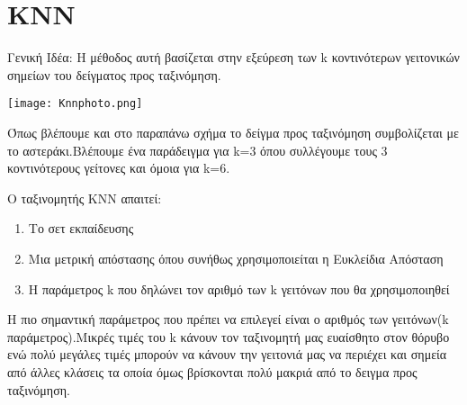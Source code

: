 \section{KNN}

Γενική Ιδέα: Η μέθοδος αυτή βασίζεται στην εξεύρεση των k κοντινότερων γειτονικών σημείων του δείγματος προς ταξινόμηση.

\begin{center}
	\texttt{[image: Knnphoto.png]}
	\label{fig:KNN}  
\end{center}

Όπως βλέπουμε και στο παραπάνω σχήμα το δείγμα προς ταξινόμηση συμβολίζεται με το αστεράκι.Βλέπουμε ένα παράδειγμα για k=3 όπου συλλέγουμε τους 3 κοντινότερους γείτονες και όμοια για k=6.

Ο ταξινομητής ΚΝΝ απαιτεί:
\begin{enumerate}
	\item Το σετ εκπαίδευσης
	\item Μια μετρική απόστασης όπου συνήθως χρησιμοποιείται η Ευκλείδια Απόσταση
	\item Η παράμετρος k που δηλώνει τον αριθμό των k γειτόνων που θα χρησιμοποιηθεί
\end{enumerate}

Η πιο σημαντική παράμετρος που πρέπει να επιλεγεί είναι ο αριθμός των γειτόνων(k παράμετρος).Μικρές τιμές του k κάνουν τον ταξινομητή μας ευαίσθητο στον θόρυβο ενώ πολύ μεγάλες τιμές μπορούν να κάνουν την γειτονιά μας να περιέχει και σημεία από άλλες κλάσεις τα οποία όμως βρίσκονται πολύ μακριά από το δειγμα προς ταξινόμηση.

